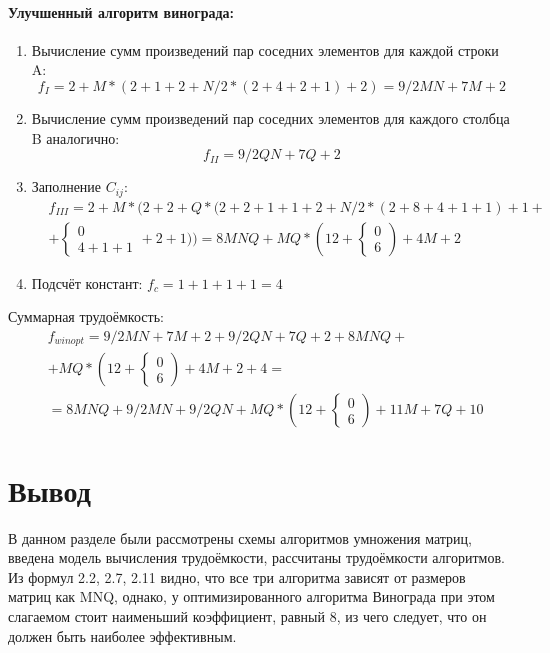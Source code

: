 \paragraph{Улучшенный алгоритм винограда:}
\begin{enumerate}
	\item Вычисление сумм произведений пар соседних элементов для каждой строки A:
	\begin{equation}
		f_{I}=2+M*(2+1+2+N/2*(2+4+2+1)+2)=9/2MN+7M+2
	\end{equation}
	\item Вычисление сумм произведений пар соседних элементов для каждого столбца B аналогично:
	\begin{equation}
		f_{II}=9/2QN+7Q+2
	\end{equation}
		\item Заполнение $C_{ij}$:
	\begin{equation}
		\begin{split}
			&f_{III}=2+M*(2+2+Q*(2+2+1+1+2+N/2*(2+8+4+1+1)+1+\\
			&+\begin{cases}0\\4+1+1\end{cases}+2+1))=8MNQ+MQ*(12+\begin{cases}0\\6\end{cases})+4M+2
		\end{split}
	\end{equation}
	\item Подсчёт констант: $f_{c}=1+1+1+1=4$
\end{enumerate}

Суммарная трудоёмкость:
\begin{equation}
	\begin{split}
		&f_{winopt}=9/2MN+7M+2+9/2QN+7Q+2+8MNQ+\\
		&+MQ*(12+\begin{cases}0\\6\end{cases})+4M+2+4=\\
		&=8MNQ+9/2MN+9/2QN+MQ*(12+\begin{cases}0\\6\end{cases})+11M+7Q+10
	\end{split}
\end{equation}

\section{Вывод}
\label{sec:design_conclusion}
В данном разделе были рассмотрены схемы алгоритмов умножения матриц, введена модель вычисления трудоёмкости, рассчитаны трудоёмкости алгоритмов. Из формул 2.2, 2.7, 2.11 видно, что все три алгоритма зависят от размеров матриц как MNQ, однако, у оптимизированного алгоритма Винограда при этом слагаемом стоит наименьший коэффициент, равный 8, из чего следует, что он должен быть наиболее эффективным.
